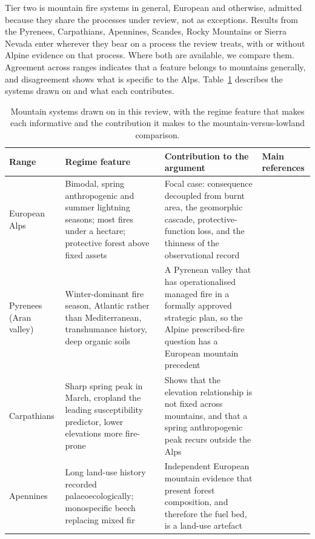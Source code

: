 \documentclass[11pt,a4paper]{article}
\begin{document}
Tier two is mountain fire systems in general, European and otherwise, admitted because they share the processes under review, not as exceptions. Results from the Pyrenees, Carpathians, Apennines, Scandes, Rocky Mountains or Sierra Nevada enter wherever they bear on a process the review treats, with or without Alpine evidence on that process. Where both are available, we compare them. Agreement across ranges indicates that a feature belongs to mountains generally, and disagreement shows what is specific to the Alps. Table~\ref{tab:ranges} describes the systems drawn on and what each contributes.

\begin{table}[htbp]
\centering
\footnotesize
\setlength{\tabcolsep}{4pt}
\renewcommand{\arraystretch}{1.1}
\caption{Mountain systems drawn on in this review, with the regime feature that makes each informative and the contribution it makes to the mountain-versus-lowland comparison.}
\label{tab:ranges}
\begin{tabularx}{\textwidth}{@{}>{\raggedright\arraybackslash}p{2.0cm} >{\raggedright\arraybackslash}p{3.3cm} >{\raggedright\arraybackslash}X >{\raggedright\arraybackslash}p{3.1cm}@{}}
\toprule
\textbf{Range} & \textbf{Regime feature} & \textbf{Contribution to the argument} & \textbf{Main references} \\
\midrule
European Alps & Bimodal, spring anthropogenic and summer lightning seasons; most fires under a hectare; protective forest above fixed assets & Focal case: consequence decoupled from burnt area, the geomorphic cascade, protective-function loss, and the thinness of the observational record & \citealp{muller_forest_2020, conedera_characterizing_2018, moos_climate_2021, melzner_wildfire-induced_2025} \\
Pyrenees (Aran valley) & Winter-dominant fire season, Atlantic rather than Mediterranean, transhumance history, deep organic soils & A Pyrenean valley that has operationalised managed fire in a formally approved strategic plan, so the Alpine prescribed-fire question has a European mountain precedent & \citealp{oliveres_path_2025} \\
Carpathians & Sharp spring peak in March, cropland the leading susceptibility predictor, lower elevations more fire-prone & Shows that the elevation relationship is not fixed across mountains, and that a spring anthropogenic peak recurs outside the Alps & \citealp{manczinger_fire_2025} \\
Apennines & Long land-use history recorded palaeoecologically; monospecific beech replacing mixed fir & Independent European mountain evidence that present forest composition, and therefore the fuel bed, is a land-use artefact & \citealp{moralesmolino_longterm_2021} \\

\end{tabularx}
\end{table}
\end{document}
